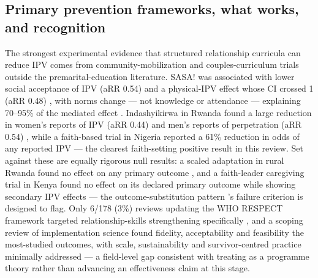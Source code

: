 \subsection{Primary prevention frameworks, what works, and recognition}
The strongest experimental evidence that structured relationship curricula can reduce IPV comes from community-mobilization and couples-curriculum trials outside the premarital-education literature. SASA! was associated with lower social acceptance of IPV (aRR 0.54) and a physical-IPV effect whose CI crossed 1 (aRR 0.48) \cite{ref24}, with norms change --- not knowledge or attendance --- explaining 70--95\% of the mediated effect \cite{ref25}. Indashyikirwa in Rwanda found a large reduction in women's reports of IPV (aRR 0.44) and men's reports of perpetration (aRR 0.54) \cite{ref26}, while a faith-based trial in Nigeria reported a 61\% reduction in odds of any reported IPV \cite{ref27} --- the clearest faith-setting positive result in this review. Set against these are equally rigorous null results: a scaled adaptation in rural Rwanda found no effect on any primary outcome \cite{ref28}, and a faith-leader caregiving trial in Kenya found no effect on its declared primary outcome while showing secondary IPV effects \cite{ref29} --- the outcome-substitution pattern \tphe{}'s failure criterion is designed to flag. Only 6/178 (3\%) reviews updating the WHO RESPECT framework targeted relationship-skills strengthening specifically \cite{ref30}, and a scoping review of implementation science found fidelity, acceptability and feasibility the most-studied outcomes, with scale, sustainability and survivor-centred practice minimally addressed \cite{ref31} --- a field-level gap consistent with treating \tphe{} as a programme theory rather than advancing an effectiveness claim at this stage.

